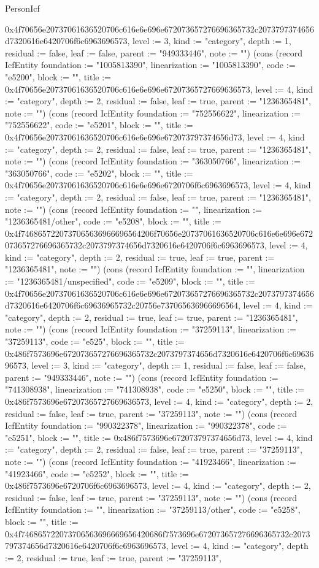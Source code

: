 \begin{lexlean}{PersonIcf}
\begin{semanticmodule}
{0x4f70656e20737061636520706c616e6e696e672073657276696365732c2073797374656d7320616e6420706f6c6963696573, level := 3, kind := "category", depth := 1, residual := false, leaf := false, parent := "949333446", note := ""}) (cons (record IcfEntity {foundation := "1005813390", linearization := "1005813390", code := "e5200", block := "", title := 0x4f70656e20737061636520706c616e6e696e67207365727669636573, level := 4, kind := "category", depth := 2, residual := false, leaf := true, parent := "1236365481", note := ""}) (cons (record IcfEntity {foundation := "752556622", linearization := "752556622", code := "e5201", block := "", title := 0x4f70656e20737061636520706c616e6e696e672073797374656d73, level := 4, kind := "category", depth := 2, residual := false, leaf := true, parent := "1236365481", note := ""}) (cons (record IcfEntity {foundation := "363050766", linearization := "363050766", code := "e5202", block := "", title := 0x4f70656e20737061636520706c616e6e696e6720706f6c6963696573, level := 4, kind := "category", depth := 2, residual := false, leaf := true, parent := "1236365481", note := ""}) (cons (record IcfEntity {foundation := "", linearization := "1236365481/other", code := "e5208", block := "", title := 0x4f7468657220737065636966696564206f70656e20737061636520706c616e6e696e672073657276696365732c2073797374656d7320616e6420706f6c6963696573, level := 4, kind := "category", depth := 2, residual := true, leaf := true, parent := "1236365481", note := ""}) (cons (record IcfEntity {foundation := "", linearization := "1236365481/unspecified", code := "e5209", block := "", title := 0x4f70656e20737061636520706c616e6e696e672073657276696365732c2073797374656d7320616e6420706f6c69636965732c20756e737065636966696564, level := 4, kind := "category", depth := 2, residual := true, leaf := true, parent := "1236365481", note := ""}) (cons (record IcfEntity {foundation := "37259113", linearization := "37259113", code := "e525", block := "", title := 0x486f7573696e672073657276696365732c2073797374656d7320616e6420706f6c6963696573, level := 3, kind := "category", depth := 1, residual := false, leaf := false, parent := "949333446", note := ""}) (cons (record IcfEntity {foundation := "741308938", linearization := "741308938", code := "e5250", block := "", title := 0x486f7573696e67207365727669636573, level := 4, kind := "category", depth := 2, residual := false, leaf := true, parent := "37259113", note := ""}) (cons (record IcfEntity {foundation := "990322378", linearization := "990322378", code := "e5251", block := "", title := 0x486f7573696e672073797374656d73, level := 4, kind := "category", depth := 2, residual := false, leaf := true, parent := "37259113", note := ""}) (cons (record IcfEntity {foundation := "41923466", linearization := "41923466", code := "e5252", block := "", title := 0x486f7573696e6720706f6c6963696573, level := 4, kind := "category", depth := 2, residual := false, leaf := true, parent := "37259113", note := ""}) (cons (record IcfEntity {foundation := "", linearization := "37259113/other", code := "e5258", block := "", title := 0x4f746865722073706563696669656420686f7573696e672073657276696365732c2073797374656d7320616e6420706f6c6963696573, level := 4, kind := "category", depth := 2, residual := true, leaf := true, parent := "37259113", }
\end{semanticmodule}
\end{lexlean}
